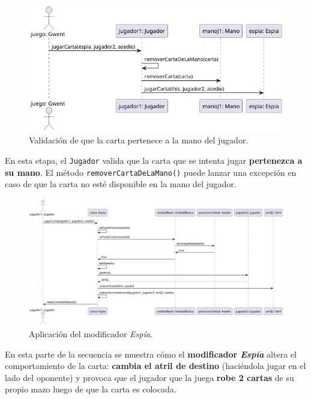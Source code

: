 \documentclass[titlepage,a4paper]{article}
\begin{document}
	\begin{figure}[H]
		\centering
		\includegraphics[width=1\textwidth]{diagramas/secuencia/JugarCarta2}
		\caption{\label{fig:secuencia02} Validación de que la carta pertenece a la mano del jugador.}
	\end{figure}
	En esta etapa, el \texttt{Jugador} valida que la carta que se intenta jugar \textbf{pertenezca a su mano}. El método \texttt{removerCartaDeLaMano()} puede lanzar una excepción en caso de que la carta no esté disponible en la mano del jugador.

	\begin{figure}[H]
		\centering
		\includegraphics[width=1\textwidth]{diagramas/secuencia/jugarCarta3}
		\caption{\label{fig:secuencia03} Aplicación del modificador \textit{Espía}.}
	\end{figure}
	En esta parte de la secuencia se muestra cómo el \textbf{modificador \textit{Espía}} altera el comportamiento de la carta: \textbf{cambia el atril de destino} (haciéndola jugar en el lado del oponente) y provoca que el jugador que la juega \textbf{robe 2 cartas} de su propio mazo luego de que la carta es colocada.
\end{document}
